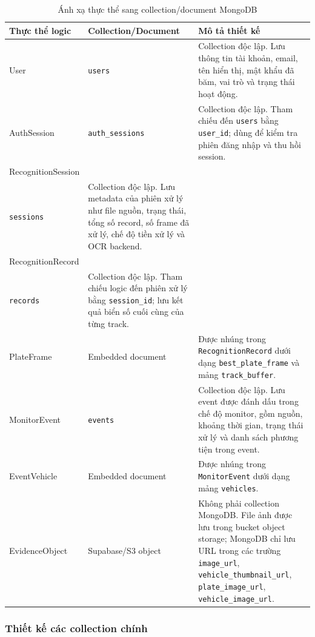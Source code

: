 \documentclass[../DoAn.tex]{subfiles}
\begin{document}
\begin{table}[htbp]
\centering
\caption{Ánh xạ thực thể sang collection/document MongoDB}
\label{tab:mongodb-collections}
\renewcommand{\arraystretch}{1.12}
\begin{tabular}{|>{\raggedright\arraybackslash}p{3.0cm}|>{\raggedright\arraybackslash}p{3.6cm}|>{\raggedright\arraybackslash}p{7.6cm}|}
\hline
\textbf{Thực thể logic} & \textbf{Collection/Document} & \textbf{Mô tả thiết kế} \\
\hline
User & \texttt{users} & Collection độc lập. Lưu thông tin tài khoản, email, tên hiển thị, mật khẩu đã băm, vai trò và trạng thái hoạt động. \\
\hline
AuthSession & \texttt{auth\_sessions} & Collection độc lập. Tham chiếu đến \texttt{users} bằng \texttt{user\_id}; dùng để kiểm tra phiên đăng nhập và thu hồi session. \\
\hline
RecognitionSession & \shortstack[l]{\texttt{recognition\_}\\\texttt{sessions}} & Collection độc lập. Lưu metadata của phiên xử lý như file nguồn, trạng thái, tổng số record, số frame đã xử lý, chế độ tiền xử lý và OCR backend. \\
\hline
RecognitionRecord & \shortstack[l]{\texttt{recognition\_}\\\texttt{records}} & Collection độc lập. Tham chiếu logic đến phiên xử lý bằng \texttt{session\_id}; lưu kết quả biển số cuối cùng của từng track. \\
\hline
PlateFrame & Embedded document & Được nhúng trong \texttt{RecognitionRecord} dưới dạng \texttt{best\_plate\_frame} và mảng \texttt{track\_buffer}. \\
\hline
MonitorEvent & \texttt{events} & Collection độc lập. Lưu event được đánh dấu trong chế độ monitor, gồm nguồn, khoảng thời gian, trạng thái xử lý và danh sách phương tiện trong event. \\
\hline
EventVehicle & Embedded document & Được nhúng trong \texttt{MonitorEvent} dưới dạng mảng \texttt{vehicles}. \\
\hline
EvidenceObject & Supabase/S3 object & Không phải collection MongoDB. File ảnh được lưu trong bucket object storage; MongoDB chỉ lưu URL trong các trường \texttt{image\_url}, \texttt{vehicle\_thumbnail\_url}, \texttt{plate\_image\_url}, \texttt{vehicle\_image\_url}. \\
\hline
\end{tabular}
\end{table}

\subsubsection{Thiết kế các collection chính}
\end{document}
